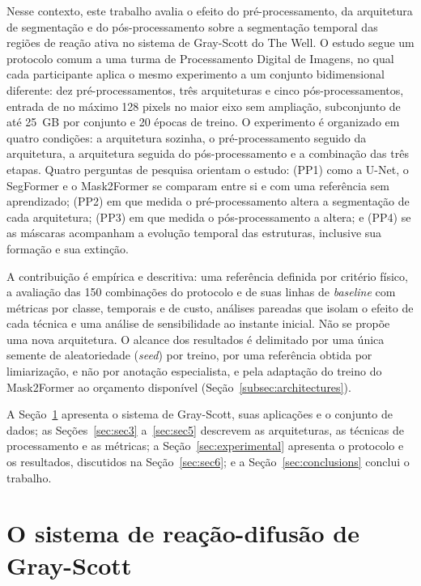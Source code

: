 \documentclass[final,5p,times,twocolumn]{elsarticle}
\begin{document}
Nesse contexto, este trabalho avalia o efeito do pré-processamento, da arquitetura de segmentação e do pós-processamento sobre a segmentação temporal das regiões de reação ativa no sistema de Gray-Scott do The Well. O estudo segue um protocolo comum a uma turma de Processamento Digital de Imagens, no qual cada participante aplica o mesmo experimento a um conjunto bidimensional diferente: dez pré-processamentos, três arquiteturas e cinco pós-processamentos, entrada de no máximo 128 pixels no maior eixo sem ampliação, subconjunto de até 25~GB por conjunto e 20 épocas de treino. O experimento é organizado em quatro condições: a arquitetura sozinha, o pré-processamento seguido da arquitetura, a arquitetura seguida do pós-processamento e a combinação das três etapas. Quatro perguntas de pesquisa orientam o estudo: (PP1) como a U-Net, o SegFormer e o Mask2Former se comparam entre si e com uma referência sem aprendizado; (PP2) em que medida o pré-processamento altera a segmentação de cada arquitetura; (PP3) em que medida o pós-processamento a altera; e (PP4) se as máscaras acompanham a evolução temporal das estruturas, inclusive sua formação e sua extinção.

A contribuição é empírica e descritiva: uma referência definida por critério físico, a avaliação das 150 combinações do protocolo e de suas linhas de \textit{baseline} com métricas por classe, temporais e de custo, análises pareadas que isolam o efeito de cada técnica e uma análise de sensibilidade ao instante inicial. Não se propõe uma nova arquitetura. O alcance dos resultados é delimitado por uma única semente de aleatoriedade (\textit{seed}) por treino, por uma referência obtida por limiarização, e não por anotação especialista, e pela adaptação do treino do Mask2Former ao orçamento disponível (Seção~\ref{subsec:architectures}).

A Seção~\ref{sec:sec2} apresenta o sistema de Gray-Scott, suas aplicações e o conjunto de dados; as Seções~\ref{sec:sec3} a~\ref{sec:sec5} descrevem as arquiteturas, as técnicas de processamento e as métricas; a Seção~\ref{sec:experimental} apresenta o protocolo e os resultados, discutidos na Seção~\ref{sec:sec6}; e a Seção~\ref{sec:conclusions} conclui o trabalho.

\section{O sistema de reação-difusão de Gray-Scott}\label{sec:sec2}
\end{document}
